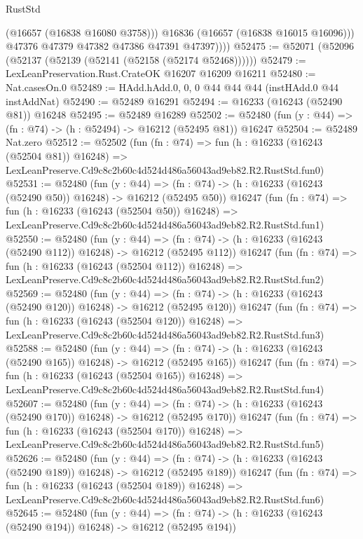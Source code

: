 \begin{lexlean}{RustStd}
\begin{coremodule}
                (@16657 (@16838 @16080 @3758)))
              @16836
              (@16657 (@16838 @16015 @16096)))
            @47376
            @47379
            @47382
            @47386
            @47391
            @47397))))
@52475 := @52071 (@52096 (@52137 (@52139 (@52141 (@52158 (@52174 @52468))))))
@52479 := LexLeanPreservation.Rust.CrateOK @16207 @16209 @16211
@52480 := Nat.casesOn.{0}
@52489 := HAdd.hAdd.{0, 0, 0} @44 @44 @44 (instHAdd.{0} @44 instAddNat)
@52490 := @52489 @16291
@52494 := @16233 (@16243 (@52490 @81)) @16248
@52495 := @52489 @16289
@52502 := @52480 (fun (y : @44) => (fn : @74) -> (h : @52494) -> @16212 (@52495 @81)) @16247
@52504 := @52489 Nat.zero
@52512 := @52502
    (fun (fn : @74) =>
    fun (h : @16233 (@16243 (@52504 @81)) @16248) =>
    LexLeanPreserve.Cd9c8c2b60c4d524d486a56043ad9eb82.R2.RustStd.fun0)
@52531 := @52480
    (fun (y : @44) =>
    (fn : @74) -> (h : @16233 (@16243 (@52490 @50)) @16248) -> @16212 (@52495 @50))
    @16247
    (fun (fn : @74) =>
    fun (h : @16233 (@16243 (@52504 @50)) @16248) =>
    LexLeanPreserve.Cd9c8c2b60c4d524d486a56043ad9eb82.R2.RustStd.fun1)
@52550 := @52480
    (fun (y : @44) =>
    (fn : @74) -> (h : @16233 (@16243 (@52490 @112)) @16248) -> @16212 (@52495 @112))
    @16247
    (fun (fn : @74) =>
    fun (h : @16233 (@16243 (@52504 @112)) @16248) =>
    LexLeanPreserve.Cd9c8c2b60c4d524d486a56043ad9eb82.R2.RustStd.fun2)
@52569 := @52480
    (fun (y : @44) =>
    (fn : @74) -> (h : @16233 (@16243 (@52490 @120)) @16248) -> @16212 (@52495 @120))
    @16247
    (fun (fn : @74) =>
    fun (h : @16233 (@16243 (@52504 @120)) @16248) =>
    LexLeanPreserve.Cd9c8c2b60c4d524d486a56043ad9eb82.R2.RustStd.fun3)
@52588 := @52480
    (fun (y : @44) =>
    (fn : @74) -> (h : @16233 (@16243 (@52490 @165)) @16248) -> @16212 (@52495 @165))
    @16247
    (fun (fn : @74) =>
    fun (h : @16233 (@16243 (@52504 @165)) @16248) =>
    LexLeanPreserve.Cd9c8c2b60c4d524d486a56043ad9eb82.R2.RustStd.fun4)
@52607 := @52480
    (fun (y : @44) =>
    (fn : @74) -> (h : @16233 (@16243 (@52490 @170)) @16248) -> @16212 (@52495 @170))
    @16247
    (fun (fn : @74) =>
    fun (h : @16233 (@16243 (@52504 @170)) @16248) =>
    LexLeanPreserve.Cd9c8c2b60c4d524d486a56043ad9eb82.R2.RustStd.fun5)
@52626 := @52480
    (fun (y : @44) =>
    (fn : @74) -> (h : @16233 (@16243 (@52490 @189)) @16248) -> @16212 (@52495 @189))
    @16247
    (fun (fn : @74) =>
    fun (h : @16233 (@16243 (@52504 @189)) @16248) =>
    LexLeanPreserve.Cd9c8c2b60c4d524d486a56043ad9eb82.R2.RustStd.fun6)
@52645 := @52480
    (fun (y : @44) =>
    (fn : @74) -> (h : @16233 (@16243 (@52490 @194)) @16248) -> @16212 (@52495 @194))

\end{coremodule}
\end{lexlean}
